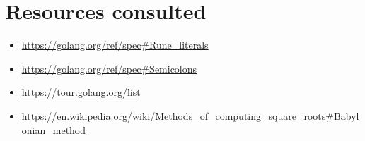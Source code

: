 \documentclass{article}
\begin{document}

\section{Resources consulted}


\begin{itemize}
\item \href{https://golang.org/ref/spec\#Rune\_literals}{https://golang.org/ref/spec\#Rune\_literals}
\item \href{https://golang.org/ref/spec\#Semicolons}{https://golang.org/ref/spec\#Semicolons}
\item \href{https://tour.golang.org/list}{https://tour.golang.org/list}
\item \href{https://en.wikipedia.org/wiki/Methods_of_computing_square_roots#Babylonian_method}{https://en.wikipedia.org/wiki/Methods\_of\_computing\_square\_roots\#Babylonian\_method}

\end{itemize}
\end{document}
